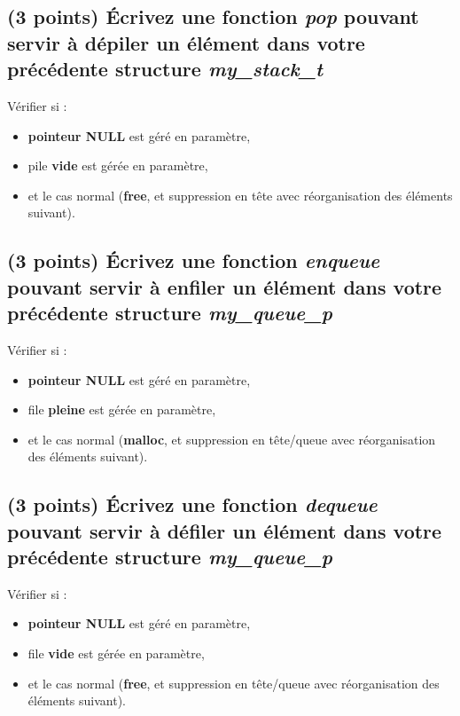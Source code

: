 \documentclass[11pt,a4paper]{article}
\begin{document}
\subsection{(3 points) \'Ecrivez une fonction \og \textit{pop} \fg{} pouvant servir à dépiler un élément dans votre précédente structure \og \textit{my\_stack\_t} \fg{} }

\bigskip

\begin{center}
Vérifier si :
\begin{itemize}
\item \textbf{pointeur NULL} est géré en paramètre,
\item pile \textbf{vide} est gérée en paramètre,
\item et le cas normal (\textbf{free}, et suppression en tête avec réorganisation des éléments suivant).
\end{itemize}
\end{center}

\bigskip

\subsection{(3 points) \'Ecrivez une fonction \og \textit{enqueue} \fg{} pouvant servir à enfiler un élément dans votre précédente structure \og \textit{my\_queue\_p} \fg{} }

\bigskip

\begin{center}
Vérifier si :
\begin{itemize}
\item \textbf{pointeur NULL} est géré en paramètre,
\item file \textbf{pleine} est gérée en paramètre,
\item et le cas normal (\textbf{malloc}, et suppression en tête/queue  avec réorganisation des éléments suivant).
\end{itemize}
\end{center}

\bigskip

\subsection{(3 points) \'Ecrivez une fonction \og \textit{dequeue} \fg{} pouvant servir à défiler un élément dans votre précédente structure \og \textit{my\_queue\_p} \fg{} }

\bigskip

\begin{center}
Vérifier si :
\begin{itemize}
\item \textbf{pointeur NULL} est géré en paramètre,
\item file \textbf{vide} est gérée en paramètre,
\item et le cas normal (\textbf{free}, et suppression en tête/queue  avec réorganisation des éléments suivant).
\end{itemize}
\end{center}

\bigskip
\end{document}
